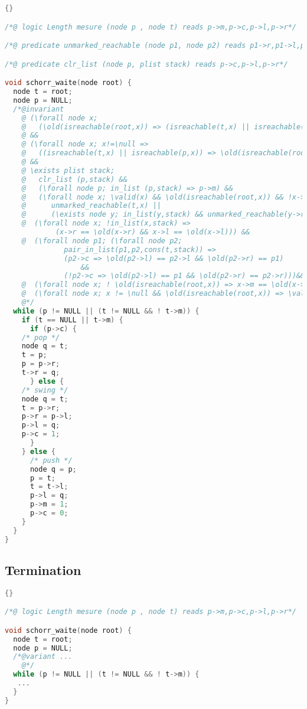 \begin{lstlisting}[language=C]{}

/*@ logic Length mesure (node p , node t) reads p->m,p->c,p->l,p->r*/

/*@ predicate unmarked_reachable (node p1, node p2) reads p1->r,p1->l,p1->m */

/*@ predicate clr_list (node p, plist stack) reads p->c,p->l,p->r*/

void schorr_waite(node root) {
  node t = root;
  node p = NULL;
  /*@invariant
    @ (\forall node x; 
    @   (\old(isreachable(root,x)) => (isreachable(t,x) || isreachable(p,x))))
    @ &&
    @ (\forall node x; x!=\null => 
    @   ((isreachable(t,x) || isreachable(p,x)) => \old(isreachable(root,x)))) 
    @ &&
    @ \exists plist stack;
    @   clr_list (p,stack) &&
    @   (\forall node p; in_list (p,stack) => p->m) &&
    @   (\forall node x; \valid(x) && \old(isreachable(root,x)) && !x->m =>
    @      unmarked_reachable(t,x) || 
    @      (\exists node y; in_list(y,stack) && unmarked_reachable(y->r,x))) &&
    @  (\forall node x; !in_list(x,stack) =>  
            (x->r == \old(x->r) && x->l == \old(x->l))) &&
    @  (\forall node p1; (\forall node p2;
              pair_in_list(p1,p2,cons(t,stack)) => 
	          (p2->c => \old(p2->l) == p2->l && \old(p2->r) == p1)
                  &&
	          (!p2->c => \old(p2->l) == p1 && \old(p2->r) == p2->r)))&&
    @  (\forall node x; ! \old(isreachable(root,x)) => x->m == \old(x->m)) &&
    @  (\forall node x; x != \null && \old(isreachable(root,x)) => \valid(x)) 
    @*/
  while (p != NULL || (t != NULL && ! t->m)) {
    if (t == NULL || t->m) {
      if (p->c) {
	/* pop */
	node q = t;
	t = p;
	p = p->r;
	t->r = q;
      } else {
	/* swing */
	node q = t;
	t = p->r;
	p->r = p->l;
	p->l = q;
	p->c = 1;
      }
    } else {
      /* push */
      node q = p;
      p = t;
      t = t->l;
      p->l = q;
      p->m = 1;
      p->c = 0;
    }
  }
}
\end{lstlisting}

\subsection{Termination}

\begin{lstlisting}[language=C]{}

/*@ logic Length mesure (node p , node t) reads p->m,p->c,p->l,p->r*/

void schorr_waite(node root) {
  node t = root;
  node p = NULL;
  /*@variant ...
    @*/
  while (p != NULL || (t != NULL && ! t->m)) {
   ...
  }
}
\end{lstlisting}

